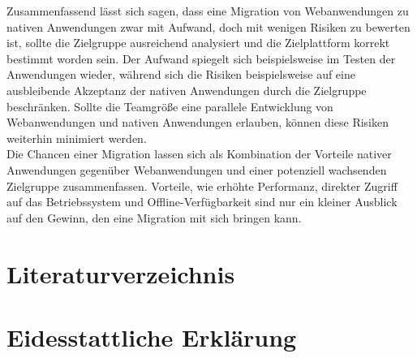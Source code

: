 \documentclass[a4paper]{scrartcl}
\begin{document}
Zusammenfassend lässt sich sagen, dass eine Migration von Webanwendungen zu nativen Anwendungen zwar mit Aufwand, doch mit wenigen Risiken zu bewerten ist, sollte die Zielgruppe ausreichend analysiert und die Zielplattform korrekt bestimmt worden sein. Der Aufwand spiegelt sich beispielsweise im Testen der Anwendungen wieder, während sich die Risiken beispielsweise auf eine ausbleibende Akzeptanz der nativen Anwendungen durch die Zielgruppe beschränken. Sollte die Teamgröße eine parallele Entwicklung von Webanwendungen und nativen Anwendungen erlauben, können diese Risiken weiterhin minimiert werden. \\
Die Chancen einer Migration lassen sich als Kombination der Vorteile nativer Anwendungen gegenüber Webanwendungen und einer potenziell wachsenden Zielgruppe zusammenfassen. Vorteile, wie erhöhte Performanz, direkter Zugriff auf das Betriebssystem und Offline-Verfügbarkeit sind nur ein kleiner Ausblick auf den Gewinn, den eine Migration mit sich bringen kann. 


\newpage


\setcounter{page}{6}


\section*{Literaturverzeichnis}

\singlespacing


\printbibliography[heading=none]

\newpage


\section*{Eidesstattliche Erklärung}


\onehalfspacing
\end{document}
